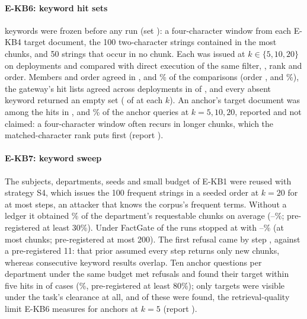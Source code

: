 \documentclass[journal,onecolumn]{IEEEtran}
\newcommand{\code}[1]{\texttt{\detokenize{#1}}}
\begin{document}
\paragraph{E-KB6: keyword hit sets}
\KbEkbSixKeywords{} keywords were frozen before any run (set
\KbEkbSixKeywordsetDigest): a four-character window from each E-KB4 target
document, the 100 two-character strings contained in the most chunks, and 50
strings that occur in no chunk. Each was issued at $k\in\{5,10,20\}$ on
\KbEkbSixDeployments{} deployments and compared with direct execution of the
same filter, \code{LIKE}, rank and order. Members and order agreed in
\KbEkbSixIdentityKFive, \KbEkbSixIdentityKTen{} and \KbEkbSixIdentityKTwenty\%
of the comparisons (order \KbEkbSixSameOrderKFive, \KbEkbSixSameOrderKTen{} and
\KbEkbSixSameOrderKTwenty\%), the gateway's hit lists agreed across
deployments in \KbEkbSixCrossIdentical{} of \KbEkbSixCrossTotal{}, and every
absent keyword returned an empty set (\KbEkbSixAbsentEmptyKTen{} of
\KbEkbSixAbsentObservationsKTen{} at each $k$). An anchor's target document
was among the hits in \KbEkbSixAnchorTargetHitPctKFive,
\KbEkbSixAnchorTargetHitPctKTen{} and \KbEkbSixAnchorTargetHitPctKTwenty\% of
the anchor queries at $k=5,10,20$, reported and not claimed: a
four-character window often recurs in longer chunks, which the
matched-character rank puts first (report \KbEkbSixReportDigest).

\paragraph{E-KB7: keyword sweep}
The subjects, departments, seeds and small budget of E-KB1 were reused with
strategy S4, which issues the 100 frequent strings in a seeded order at
$k=20$ for at most \KbEkbSevenMaxSteps{} steps, an attacker that knows the
corpus's frequent terms. Without a ledger it obtained
\KbEkbSevenAclLeakMeanPct\% of the department's requestable chunks on
average (\KbEkbSevenAclLeakMinPct--\KbEkbSevenAclLeakMaxPct\%; pre-registered
at least 30\%). Under FactGate \KbEkbSevenFactGateStopBudgetRuns{} of the
\KbEkbSevenFactGateRuns{} runs stopped at \code{EXPOSURE_BUDGET_EXHAUSTED}
with \KbEkbSevenFactGateLeakMinPct--\KbEkbSevenFactGateLeakMaxPct\% (at most
\KbEkbSevenFactGateChunksMax{} chunks; pre-registered at most 200). The first
refusal came by step \KbEkbSevenFactGateFirstRefusalMax{}, against a
pre-registered 11: that prior assumed every step returns only new chunks,
whereas consecutive keyword results overlap. Ten anchor questions per
department under the same budget met \KbEkbSevenLegitRefusals{} refusals and
found their target within five hits in \KbEkbSevenLegitCompleted{} of
\KbEkbSevenLegitQuestions{} cases (\KbEkbSevenLegitCompletionPct\%,
pre-registered at least 80\%); only \KbEkbSevenLegitVisible{} targets were
visible under the task's clearance at all, and of these
\KbEkbSevenLegitCompletedVisible{} were found, the retrieval-quality limit
E-KB6 measures for anchors at $k=5$ (report \KbEkbSevenReportDigest).
\end{document}

